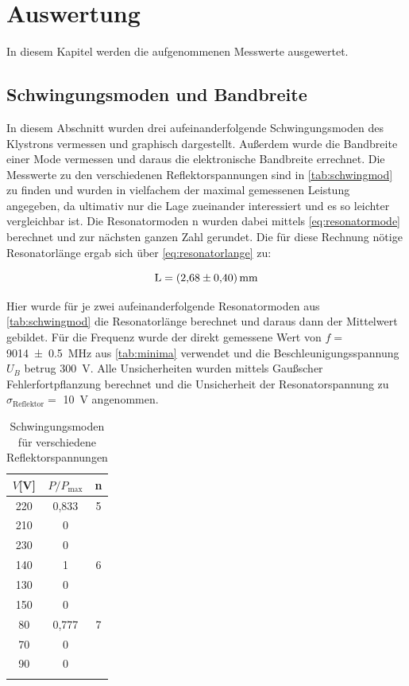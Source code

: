 


\section{Auswertung}
\label{sec:auswertung}

In diesem Kapitel werden die aufgenommenen Messwerte ausgewertet.




\subsection{Schwingungsmoden und Bandbreite}
\label{sec:schwingungsmoden}

In diesem Abschnitt wurden drei aufeinanderfolgende Schwingungsmoden des Klystrons vermessen und graphisch dargestellt.
Außerdem wurde die Bandbreite einer Mode vermessen und daraus die elektronische Bandbreite errechnet.
Die Messwerte zu den verschiedenen Reflektorspannungen sind in \autoref{tab:schwingmod} zu finden und wurden in vielfachem der maximal gemessenen Leistung angegeben, da ultimativ nur die Lage zueinander interessiert und es so leichter vergleichbar ist.
Die Resonatormoden n wurden dabei mittels \autoref{eq:resonatormode} berechnet und zur nächsten ganzen Zahl gerundet. Die für diese Rechnung nötige Resonatorlänge ergab sich über \autoref{eq:resonatorlange} zu:

\begin{equation}
\label{eq:auswertunglänge}
\text{L} = \SI{2,68\pm0,40}{\milli\metre}
\end{equation}

Hier wurde für je zwei aufeinanderfolgende Resonatormoden aus \autoref{tab:schwingmod} die Resonatorlänge berechnet und daraus dann der Mittelwert gebildet. Für die Frequenz wurde der direkt gemessene Wert von $f =$ \SI{9014\pm0,5}{\mega\hertz} aus \autoref{tab:minima} verwendet und die Beschleunigungsspannung $U_B$ betrug \SI{300}{\volt}. Alle Unsicherheiten wurden mittels Gaußscher Fehlerfortpflanzung berechnet und die Unsicherheit der Resonatorspannung zu $\sigma_\text{Reflektor} =$ \SI{10}{\volt} angenommen.


\begin{table}
\centering
\caption{Schwingungsmoden für verschiedene Reflektorspannungen}
\begin{tabular}{c c c}
\toprule
{$V$[V]} & {$P/P_{\text{max}}$} & {n}\\
\midrule
220&	0,833&5\\
210	&0&\\
230	&0&\\
\midrule
140	&1&6\\
130	&0&\\
150	&0&\\
\midrule
80	&0,777&7\\
70	&0&\\
90	&0&\\
\bottomrule
\label{tab:schwingmod}
\end{tabular}
\end{table}






